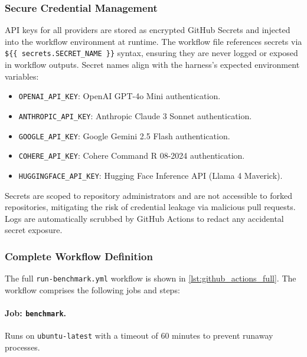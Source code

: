 \subsubsection{Secure Credential Management}

API keys for all providers are stored as encrypted GitHub Secrets and injected into the workflow environment at runtime. The workflow file references secrets via \texttt{\$\{\{ secrets.SECRET\_NAME \}\}} syntax, ensuring they are never logged or exposed in workflow outputs. Secret names align with the harness's expected environment variables:

\begin{itemize}
\item \texttt{OPENAI\_API\_KEY}: OpenAI GPT-4o Mini authentication.
\item \texttt{ANTHROPIC\_API\_KEY}: Anthropic Claude 3 Sonnet authentication.
\item \texttt{GOOGLE\_API\_KEY}: Google Gemini 2.5 Flash authentication.
\item \texttt{COHERE\_API\_KEY}: Cohere Command R 08-2024 authentication.
\item \texttt{HUGGINGFACE\_API\_KEY}: Hugging Face Inference API (Llama 4 Maverick).
\end{itemize}

Secrets are scoped to repository administrators and are not accessible to forked repositories, mitigating the risk of credential leakage via malicious pull requests. Logs are automatically scrubbed by GitHub Actions to redact any accidental secret exposure.

\subsubsection{Complete Workflow Definition}

The full \texttt{run-benchmark.yml} workflow is shown in \cref{lst:github_actions_full}. The workflow comprises the following jobs and steps:

\paragraph{Job: \texttt{benchmark}.} Runs on \texttt{ubuntu-latest} with a timeout of 60 minutes to prevent runaway processes.

